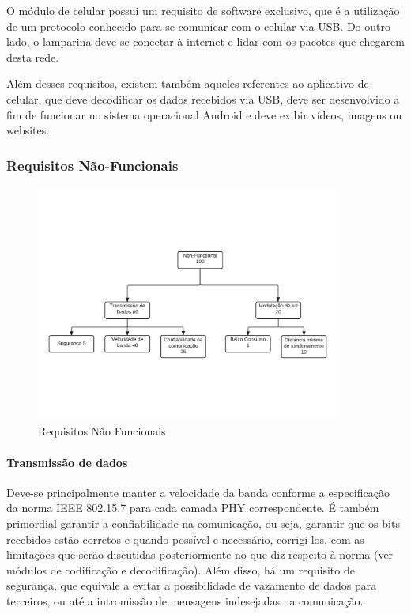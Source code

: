 	O módulo de celular possui um requisito de software exclusivo, que é a utilização de um protocolo conhecido para se comunicar com o celular via USB. Do outro lado, o lamparina deve se conectar à internet e lidar com os pacotes que chegarem desta rede. 
	
	Além desses requisitos, existem também aqueles referentes ao aplicativo de celular, que deve decodificar os dados recebidos via USB, deve ser desenvolvido a fim de funcionar no sistema operacional Android e deve exibir vídeos, imagens ou websites.
	
	\subsubsection{Requisitos Não-Funcionais}\label{subsubsec-requisitos-nfunc}
	
	\begin{figure}[h!]
		\caption{\label{fig_req2} Requisitos Não Funcionais}
		\centering		%
		\includegraphics[width=0.9\textwidth, trim={1cm 5.5cm 1cm 5.7cm}, clip]{ReqTree2.pdf}
	\end{figure}

	\paragraph{Transmissão de dados} 
	Deve-se principalmente manter a velocidade da banda conforme a especificação da norma IEEE 802.15.7 para cada camada PHY correspondente. É também primordial garantir a confiabilidade na comunicação, ou seja, garantir que os bits recebidos estão corretos e quando possível e necessário, corrigi-los, com as limitações que serão discutidas posteriormente no que diz respeito à norma (ver módulos de codificação e decodificação). Além disso, há um requisito de segurança, que equivale a evitar a possibilidade de vazamento de dados para terceiros, ou até a intromissão de mensagens indesejadas na comunicação.
	
